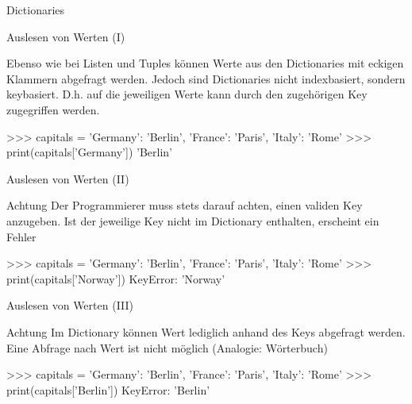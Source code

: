 \begin{subsection}{Dictionaries}
        
        \begin{frame}[fragile]{Auslesen von Werten (I)}
            
            Ebenso wie bei Listen und Tuples können Werte aus den Dictionaries mit eckigen Klammern abgefragt werden. Jedoch sind Dictionaries nicht indexbasiert, sondern keybasiert. D.h. auf die jeweiligen Werte kann durch den zugehörigen Key zugegriffen werden.
            
\begin{pyconcode}
>>> capitals = {'Germany': 'Berlin', 'France': 'Paris', 'Italy': 'Rome'}
>>> print(capitals['Germany'])
'Berlin'
\end{pyconcode}    
                
    
        \end{frame}
    
        \begin{frame}[fragile]{Auslesen von Werten (II)}
            
            \begin{alertblock}{Achtung}
                Der Programmierer muss stets darauf achten, einen validen Key anzugeben. Ist der jeweilige Key nicht im Dictionary enthalten, erscheint ein Fehler
                
\begin{pyconcode}
>>> capitals = {'Germany': 'Berlin', 'France': 'Paris', 'Italy': 'Rome'}
>>> print(capitals['Norway'])
KeyError: 'Norway'
\end{pyconcode}    
    
        \end{alertblock}
    
        \end{frame}
        
        \begin{frame}[fragile]{Auslesen von Werten (III)}
            
            \begin{alertblock}{Achtung}
                Im Dictionary können Wert lediglich anhand des Keys abgefragt werden. Eine Abfrage nach Wert ist nicht möglich (Analogie: Wörterbuch)
            
\begin{pyconcode}
>>> capitals = {'Germany': 'Berlin', 'France': 'Paris', 'Italy': 'Rome'}
>>> print(capitals['Berlin'])
KeyError: 'Berlin'
\end{pyconcode}    
                
        \end{alertblock}
        \end{frame}
        

\end{subsection}
